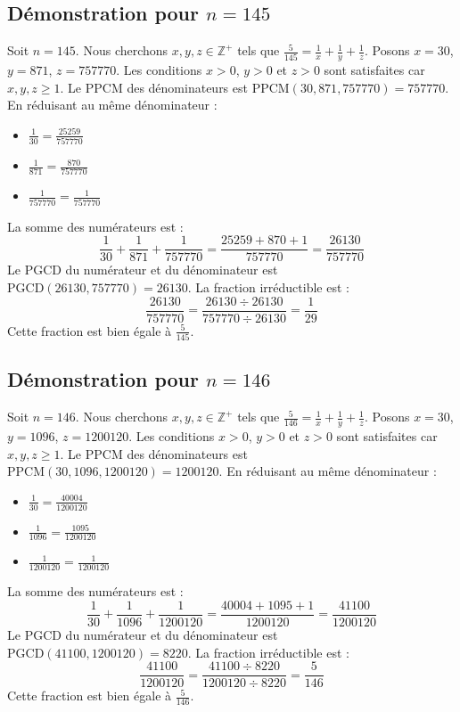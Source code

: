\documentclass[11pt,a4paper]{article}
\begin{document}
\subsection{Démonstration pour $n = 145$}
Soit $n = 145$. Nous cherchons $x, y, z \in \mathbb{Z}^{+}$ tels que $\frac{5}{145} = \frac{1}{x} + \frac{1}{y} + \frac{1}{z}$.
Posons $x = 30$, $y = 871$, $z = 757770$.
Les conditions $x > 0$, $y > 0$ et $z > 0$ sont satisfaites car $x, y, z \geq 1$.
Le PPCM des dénominateurs est $\text{PPCM}(30, 871, 757770) = 757770$.
En réduisant au même dénominateur :
\begin{itemize}
    \item $\frac{1}{30} = \frac{25259}{757770}$
    \item $\frac{1}{871} = \frac{870}{757770}$
    \item $\frac{1}{757770} = \frac{1}{757770}$
\end{itemize}
La somme des numérateurs est :
$$ \frac{1}{30} + \frac{1}{871} + \frac{1}{757770} = \frac{25259 + 870 + 1}{757770} = \frac{26130}{757770} $$
Le PGCD du numérateur et du dénominateur est $\text{PGCD}(26130, 757770) = 26130$.
La fraction irréductible est :
$$ \frac{26130}{757770} = \frac{26130 \div 26130}{757770 \div 26130} = \frac{1}{29} $$
Cette fraction est bien égale à $\frac{5}{145}$.

\subsection{Démonstration pour $n = 146$}
Soit $n = 146$. Nous cherchons $x, y, z \in \mathbb{Z}^{+}$ tels que $\frac{5}{146} = \frac{1}{x} + \frac{1}{y} + \frac{1}{z}$.
Posons $x = 30$, $y = 1096$, $z = 1200120$.
Les conditions $x > 0$, $y > 0$ et $z > 0$ sont satisfaites car $x, y, z \geq 1$.
Le PPCM des dénominateurs est $\text{PPCM}(30, 1096, 1200120) = 1200120$.
En réduisant au même dénominateur :
\begin{itemize}
    \item $\frac{1}{30} = \frac{40004}{1200120}$
    \item $\frac{1}{1096} = \frac{1095}{1200120}$
    \item $\frac{1}{1200120} = \frac{1}{1200120}$
\end{itemize}
La somme des numérateurs est :
$$ \frac{1}{30} + \frac{1}{1096} + \frac{1}{1200120} = \frac{40004 + 1095 + 1}{1200120} = \frac{41100}{1200120} $$
Le PGCD du numérateur et du dénominateur est $\text{PGCD}(41100, 1200120) = 8220$.
La fraction irréductible est :
$$ \frac{41100}{1200120} = \frac{41100 \div 8220}{1200120 \div 8220} = \frac{5}{146} $$
Cette fraction est bien égale à $\frac{5}{146}$.
\end{document}
